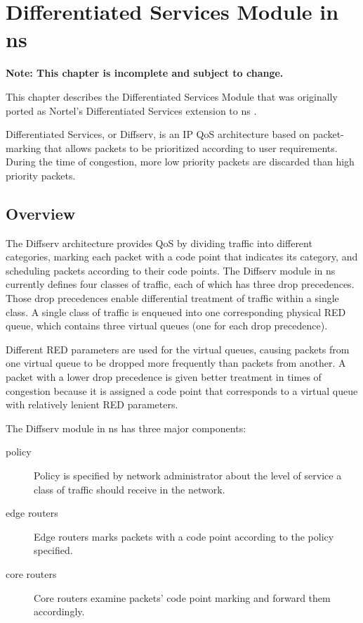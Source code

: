 %
%
%
\chapter{Differentiated Services Module in ns}
\label{chap:diffserv}


\textbf{Note: This chapter is incomplete and subject to change.}

This chapter describes the Differentiated Services Module that was originally 
ported as Nortel's Differentiated Services extension to ns \cite{Diffserv}.

Differentiated Services, or Diffserv, is an IP QoS architecture based on 
packet-marking that allows packets to be prioritized according to user 
requirements.  During the time of congestion, more low priority packets are 
discarded than high priority packets.

\section{Overview}
\label{sec:diffservoverview}

The Diffserv architecture provides QoS by dividing traffic into different 
categories, marking each packet with a code point that indicates its category, 
and scheduling packets according to their code points. The Diffserv module in 
ns currently defines four classes of traffic, each of which has three drop 
precedences.  Those drop precedences enable differential treatment of traffic 
within a single class. A single class of traffic is enqueued into one 
corresponding physical RED queue, which contains three virtual queues (one for
each drop precedence).

Different RED parameters are used for the virtual queues, causing packets from 
one virtual queue to be dropped more frequently than packets from another.  A 
packet with a lower drop precedence is given better treatment in times of 
congestion because it is assigned a code point that corresponds to a virtual 
queue with relatively lenient RED parameters.  

The Diffserv module in ns has three major components:
\begin{description}

\item [policy]
Policy is specified by network administrator about the level of service a class
of traffic should receive in the network.  

\item [edge routers]
Edge routers marks packets with a code point according to the policy specified.

\item [core routers]
Core routers examine packets' code point marking and forward them accordingly.

\end{description}

